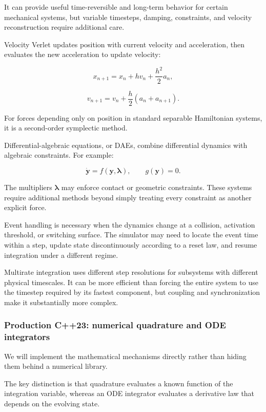 It can provide useful time-reversible and long-term behavior for certain mechanical systems, but variable timesteps, damping, constraints, and velocity reconstruction require additional care.

Velocity Verlet updates position with current velocity and acceleration, then evaluates the new acceleration to update velocity:

\[
x_{n+1}=x_n+hv_n+\frac{h^2}{2}a_n,
\]

\[
v_{n+1}=v_n+\frac h2(a_n+a_{n+1}).
\]

For forces depending only on position in standard separable Hamiltonian systems, it is a second-order symplectic method.

Differential-algebraic equations, or DAEs, combine differential dynamics with algebraic constraints. For example:

\[
\dot{\mathbf y}=f(\mathbf y,\boldsymbol\lambda), \qquad g(\mathbf y)=0.
\]

The multipliers \(\boldsymbol\lambda\) may enforce contact or geometric constraints. These systems require additional methods beyond simply treating every constraint as another explicit force.

Event handling is necessary when the dynamics change at a collision, activation threshold, or switching surface. The simulator may need to locate the event time within a step, update state discontinuously according to a reset law, and resume integration under a different regime.

Multirate integration uses different step resolutions for subsystems with different physical timescales. It can be more efficient than forcing the entire system to use the timestep required by its fastest component, but coupling and synchronization make it substantially more complex.

\subsubsection{Production C++23: numerical quadrature and ODE integrators}\label{02-foundations-ii-ch025-production-c23-numerical-quadrature-and-ode-integrators}

\hypertarget{02-foundations-ii-ch025-production-c23-numerical-quadrature-and-ode-integrators}{}

We will implement the mathematical mechanisms directly rather than hiding them behind a numerical library.

The key distinction is that quadrature evaluates a known function of the integration variable, whereas an ODE integrator evaluates a derivative law that depends on the evolving state.

